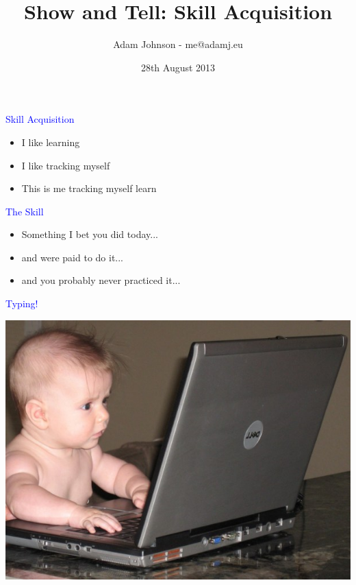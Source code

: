 \documentclass[landscape]{slides}
\title{Show and Tell: Skill Acquisition}
\author{Adam Johnson - me@adamj.eu}
\date{28th August 2013}
\begin{document}
\maketitle

\begin{slide}

    \textcolor{blue}{\Large{Skill Acquisition}}

    \begin{itemize}
        \item I like learning
        \item I like tracking myself
        \item This is me tracking myself learn
    \end{itemize}

\end{slide}

\begin{slide}

    \textcolor{blue}{\Large{The Skill}}

    \begin{itemize}
        \item Something I bet you did today...
        \item and were paid to do it...
        \item and you probably never practiced it...
    \end{itemize}

\end{slide}

\begin{slide}

    \textcolor{blue}{\Large{Typing!}}

    \includegraphics[height=10cm]{baby-nerd}

\end{slide}
\end{document}
